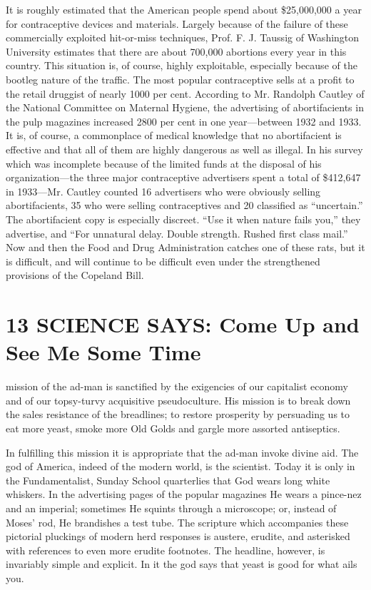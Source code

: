 \documentclass[nohyper,openany,nobib]{tufte-book}
\let\oldchapter\chapter
\def\chapter{%
  \setcounter{footnote}{0}%
  \oldchapter
}
\begin{document}
It is roughly estimated that the American people spend about
\$25,000,000 a year for contraceptive devices and materials. Largely
because of the failure of these commercially exploited hit-or-miss
techniques, Prof. F. J. Taussig of Washington University estimates that
there are about 700,000 abortions every year in this country. This
situation is, of course, highly exploitable, especially because of the
bootleg nature of the traffic. The most popular contraceptive sells at a
profit to the retail druggist of nearly 1000 per cent. According to Mr.
Randolph Cautley of the National Committee on Maternal Hygiene, the
advertising of abortifacients in the pulp magazines increased 2800 per
cent in one year---between 1932 and 1933. It is, of course, a
commonplace of medical knowledge that no abortifacient is effective and
that all of them are highly dangerous as well as illegal. In his survey
which was incomplete because of the limited funds at the disposal of his
organization---the three major contraceptive advertisers spent a total
of \$412,647 in 1933---Mr. Cautley counted 16 advertisers who were
obviously selling abortifacients, 35 who were selling contraceptives and
20 classified as ``uncertain.'' The abortifacient copy is especially
discreet. ``Use it when nature fails you,'' they advertise, and ``For
unnatural delay. Double strength. Rushed first class mail.'' Now and
then the Food and Drug Administration catches one of these rats, but it
is difficult, and will continue to be difficult even under the
strengthened provisions of the Copeland Bill.
 

\chapter[13 \hspace*{1mm} SCIENCE SAYS: Come Up and See Me Some Time]{13 SCIENCE SAYS: Come Up and See Me Some Time}

 mission of the ad-man is sanctified by the exigencies of our
capitalist economy and of our topsy-turvy acquisitive pseudoculture. His
mission is to break down the sales resistance of the breadlines; to
restore prosperity by persuading us to eat more yeast, smoke more Old
Golds and gargle more assorted antiseptics.

In fulfilling this mission it is appropriate that the ad-man invoke
divine aid. The god of America, indeed of the modern world, is the
scientist. Today it is only in the Fundamentalist, Sunday School
quarterlies that God wears long white whiskers. In the advertising pages
of the popular magazines He wears a pince-nez and an imperial; sometimes
He squints through a microscope; or, instead of Moses' rod, He
brandishes a test tube. The scripture which accompanies these pictorial
pluckings of modern herd responses is austere, erudite, and asterisked
with references to even more erudite footnotes. The headline, however,
is invariably simple and explicit. In it the god says that yeast is good
for what ails you.
\end{document}
